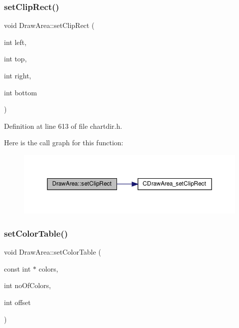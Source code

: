 \subsubsection{\texorpdfstring{set\+Clip\+Rect()}{setClipRect()}}
{\footnotesize\ttfamily void Draw\+Area\+::set\+Clip\+Rect (\begin{DoxyParamCaption}\item[{int}]{left,  }\item[{int}]{top,  }\item[{int}]{right,  }\item[{int}]{bottom }\end{DoxyParamCaption})\hspace{0.3cm}{\ttfamily [inline]}}



Definition at line 613 of file chartdir.\+h.

Here is the call graph for this function\+:
\nopagebreak
\begin{figure}[H]
\begin{center}
\leavevmode
\includegraphics[width=350pt]{class_draw_area_a352e5b4cd7cc173079fafe4a62346961_cgraph}
\end{center}
\end{figure}
\mbox{\label{class_draw_area_a51598b0080fd71cd21e798bc208da31b}} 
\subsubsection{\texorpdfstring{set\+Color\+Table()}{setColorTable()}\hspace{0.1cm}{\footnotesize\ttfamily [1/2]}}
{\footnotesize\ttfamily void Draw\+Area\+::set\+Color\+Table (\begin{DoxyParamCaption}\item[{const int $\ast$}]{colors,  }\item[{int}]{no\+Of\+Colors,  }\item[{int}]{offset }\end{DoxyParamCaption})\hspace{0.3cm}{\ttfamily [inline]}}



